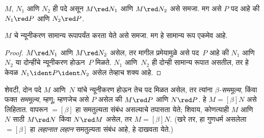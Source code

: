 \documentclass[../../../include/open-logic-section]{subfiles}
\begin{document}

\begin{thm}
$M$, $N_1$ आणि $N_2$ ही पदे असून $M \red N_1$ आणि $M \red
N_2$ असे समजा. मग असे $P$ पद आहे की $N_1 \red P$ आणि $N_2 \red P$.
\end{thm}

\begin{cor}
$M$ चे न्यूनीकरण सामान्य रूपापर्यंत करता येते असे समजा. मग हे
सामान्य रूप एकमेव आहे.
\end{cor}

\begin{proof}
$M \red N_1$ आणि $M \red N_2$ असेल, तर मागील प्रमेयामुळे
असे पद~$P$ आहे की $N_1$ आणि $N_2$ या दोन्हींचे न्यूनीकरण
होऊन~$P$ मिळते. $N_1$ आणि~$N_2$ ही दोन्ही सामान्य रूपात
असतील, तर हे केवळ $N_1 \ident P \ident N_2$ असेल तेव्हाच शक्य आहे.
\end{proof}

शेवटी, दोन पदे $M$ आणि~$N$ यांचे न्यूनीकरण होऊन तेच पद मिळत
असेल, तर त्यांना \emph{$\beta$-सममूल्य}, किंवा फक्त
\emph{सममूल्य}, म्हणू; म्हणजेच असे $P$ असेल की $M
\red P$ आणि $N \red P$. हे $M \equal[\beta] N$ असे लिहितात.
 वापरून $\equal[\beta]$ हा
समतुल्यता संबंध असल्याचे तपासता येते; शिवाय, कोणत्याही $M$
आणि~$N$ साठी $M \red N$ किंवा $N \red M$ असेल, तर
$M \equal[\beta] N$. (खरे तर, हा गुणधर्म असलेला
$\equal[\beta]$ हा \emph{लहानात लहान} समतुल्यता संबंध आहे,
हे दाखवता येते.)
\end{document}
